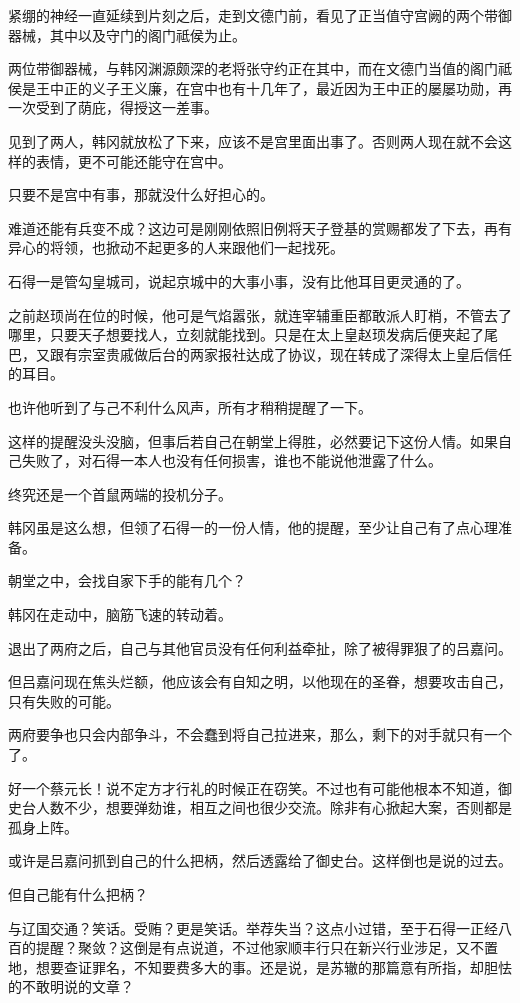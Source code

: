 紧绷的神经一直延续到片刻之后，走到文德门前，看见了正当值守宫阙的两个带御器械，其中以及守门的阁门祗侯为止。

两位带御器械，与韩冈渊源颇深的老将张守约正在其中，而在文德门当值的阁门祗侯是王中正的义子王义廉，在宫中也有十几年了，最近因为王中正的屡屡功勋，再一次受到了荫庇，得授这一差事。

见到了两人，韩冈就放松了下来，应该不是宫里面出事了。否则两人现在就不会这样的表情，更不可能还能守在宫中。

只要不是宫中有事，那就没什么好担心的。

难道还能有兵变不成？这边可是刚刚依照旧例将天子登基的赏赐都发了下去，再有异心的将领，也掀动不起更多的人来跟他们一起找死。

石得一是管勾皇城司，说起京城中的大事小事，没有比他耳目更灵通的了。

之前赵顼尚在位的时候，他可是气焰嚣张，就连宰辅重臣都敢派人盯梢，不管去了哪里，只要天子想要找人，立刻就能找到。只是在太上皇赵顼发病后便夹起了尾巴，又跟有宗室贵戚做后台的两家报社达成了协议，现在转成了深得太上皇后信任的耳目。

也许他听到了与己不利什么风声，所有才稍稍提醒了一下。

这样的提醒没头没脑，但事后若自己在朝堂上得胜，必然要记下这份人情。如果自己失败了，对石得一本人也没有任何损害，谁也不能说他泄露了什么。

终究还是一个首鼠两端的投机分子。

韩冈虽是这么想，但领了石得一的一份人情，他的提醒，至少让自己有了点心理准备。

朝堂之中，会找自家下手的能有几个？

韩冈在走动中，脑筋飞速的转动着。

退出了两府之后，自己与其他官员没有任何利益牵扯，除了被得罪狠了的吕嘉问。

但吕嘉问现在焦头烂额，他应该会有自知之明，以他现在的圣眷，想要攻击自己，只有失败的可能。

两府要争也只会内部争斗，不会蠢到将自己拉进来，那么，剩下的对手就只有一个了。

好一个蔡元长！说不定方才行礼的时候正在窃笑。不过也有可能他根本不知道，御史台人数不少，想要弹劾谁，相互之间也很少交流。除非有心掀起大案，否则都是孤身上阵。

或许是吕嘉问抓到自己的什么把柄，然后透露给了御史台。这样倒也是说的过去。

但自己能有什么把柄？

与辽国交通？笑话。受贿？更是笑话。举荐失当？这点小过错，至于石得一正经八百的提醒？聚敛？这倒是有点说道，不过他家顺丰行只在新兴行业涉足，又不置地，想要查证罪名，不知要费多大的事。还是说，是苏辙的那篇意有所指，却胆怯的不敢明说的文章？

